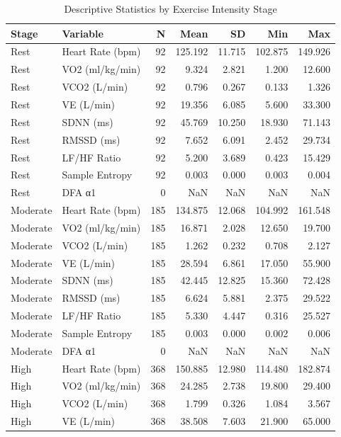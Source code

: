 \begin{table}[htbp]
\centering
\caption{Descriptive Statistics by Exercise Intensity Stage}
\label{tab:table_descriptive_statistics}
\small
\begin{tabular}{llrrrrr}
\toprule
Stage & Variable & N & Mean & SD & Min & Max \\
\midrule
Rest & Heart Rate (bpm) & 92 & 125.192 & 11.715 & 102.875 & 149.926 \\
Rest & VO2 (ml/kg/min) & 92 & 9.324 & 2.821 & 1.200 & 12.600 \\
Rest & VCO2 (L/min) & 92 & 0.796 & 0.267 & 0.133 & 1.326 \\
Rest & VE (L/min) & 92 & 19.356 & 6.085 & 5.600 & 33.300 \\
Rest & SDNN (ms) & 92 & 45.769 & 10.250 & 18.930 & 71.143 \\
Rest & RMSSD (ms) & 92 & 7.652 & 6.091 & 2.452 & 29.734 \\
Rest & LF/HF Ratio & 92 & 5.200 & 3.689 & 0.423 & 15.429 \\
Rest & Sample Entropy & 92 & 0.003 & 0.000 & 0.003 & 0.004 \\
Rest & DFA α1 & 0 & NaN & NaN & NaN & NaN \\
Moderate & Heart Rate (bpm) & 185 & 134.875 & 12.068 & 104.992 & 161.548 \\
Moderate & VO2 (ml/kg/min) & 185 & 16.871 & 2.028 & 12.650 & 19.700 \\
Moderate & VCO2 (L/min) & 185 & 1.262 & 0.232 & 0.708 & 2.127 \\
Moderate & VE (L/min) & 185 & 28.594 & 6.861 & 17.050 & 55.900 \\
Moderate & SDNN (ms) & 185 & 42.445 & 12.825 & 15.360 & 72.428 \\
Moderate & RMSSD (ms) & 185 & 6.624 & 5.881 & 2.375 & 29.522 \\
Moderate & LF/HF Ratio & 185 & 5.330 & 4.447 & 0.316 & 25.527 \\
Moderate & Sample Entropy & 185 & 0.003 & 0.000 & 0.002 & 0.006 \\
Moderate & DFA α1 & 0 & NaN & NaN & NaN & NaN \\
High & Heart Rate (bpm) & 368 & 150.885 & 12.980 & 114.480 & 182.874 \\
High & VO2 (ml/kg/min) & 368 & 24.285 & 2.738 & 19.800 & 29.400 \\
High & VCO2 (L/min) & 368 & 1.799 & 0.326 & 1.084 & 3.567 \\
High & VE (L/min) & 368 & 38.508 & 7.603 & 21.900 & 65.000 \\

\end{tabular}
\end{table}
